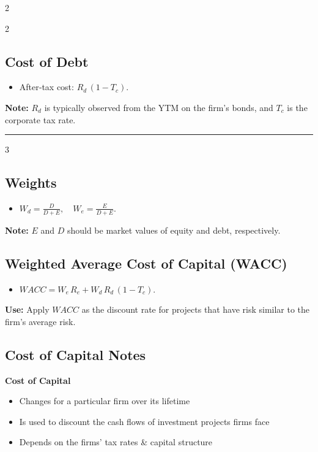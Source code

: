\documentclass[10pt,landscape,fleqn]{article}
\begin{document}
\begin{multicols}{2}
\begin{multicols}{2}
\subsection*{Cost of Debt}
\begin{itemize}
  \item After‐tax cost: $R_d\,(1 - T_c).$
\end{itemize}
\textbf{Note:} $R_d$ is typically observed from the YTM on the firm’s bonds, and $T_c$ is the corporate tax rate.

\end{multicols}
\end{multicols}

\noindent\rule{\linewidth}{0.01pt}
\begin{multicols*}{3}

\subsection*{Weights}
\begin{itemize}
  \item $W_d = \frac{D}{D + E}, \quad W_e = \frac{E}{D + E}.$
\end{itemize}
\textbf{Note:} $E$ and $D$ should be market values of equity and debt, respectively.

\subsection*{Weighted Average Cost of Capital (WACC)}
\begin{itemize}
  \item $WACC = W_e\,R_e + W_d\,R_d\,(1 - T_c).$
\end{itemize}
\textbf{Use:} Apply $WACC$ as the discount rate for projects that have risk similar to the firm’s average risk.  

\subsection{Cost of Capital Notes}
\textbf{Cost of Capital}
\begin{itemize}
  \item Changes for a particular firm over its lifetime
  \item Is used to discount the cash flows of investment projects firms face
  \item Depends on the firms' tax rates \& capital structure
\end{itemize}

\end{multicols*}
\end{document}
